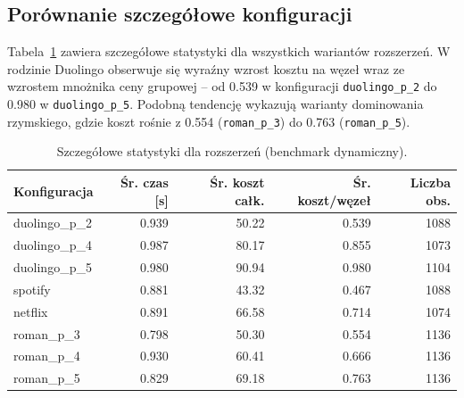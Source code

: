 \subsection{Porównanie szczegółowe konfiguracji}

Tabela~\ref{tab:ext-dynamic-detailed} zawiera szczegółowe statystyki dla wszystkich wariantów rozszerzeń. W rodzinie Duolingo obserwuje się wyraźny wzrost kosztu na węzeł wraz ze wzrostem mnożnika ceny grupowej -- od 0.539 w konfiguracji \texttt{duolingo\_p\_2} do 0.980 w \texttt{duolingo\_p\_5}. Podobną tendencję wykazują warianty dominowania rzymskiego, gdzie koszt rośnie z 0.554 (\texttt{roman\_p\_3}) do 0.763 (\texttt{roman\_p\_5}).

\begin{table}[H]
    \centering
    \caption{Szczegółowe statystyki dla rozszerzeń (benchmark dynamiczny).}
    \label{tab:ext-dynamic-detailed}
    \begin{tabular}{lrrrr}
        \toprule
        \textbf{Konfiguracja} & \textbf{Śr. czas [s]} & \textbf{Śr. koszt całk.} & \textbf{Śr. koszt/węzeł} & \textbf{Liczba obs.} \\
        \midrule
        duolingo\_p\_2        & 0.939                 & 50.22                    & 0.539                    & 1088                 \\
        duolingo\_p\_4        & 0.987                 & 80.17                    & 0.855                    & 1073                 \\
        duolingo\_p\_5        & 0.980                 & 90.94                    & 0.980                    & 1104                 \\
        spotify               & 0.881                 & 43.32                    & 0.467                    & 1088                 \\
        netflix               & 0.891                 & 66.58                    & 0.714                    & 1074                 \\
        roman\_p\_3           & 0.798                 & 50.30                    & 0.554                    & 1136                 \\
        roman\_p\_4           & 0.930                 & 60.41                    & 0.666                    & 1136                 \\
        roman\_p\_5           & 0.829                 & 69.18                    & 0.763                    & 1136                 \\
        \bottomrule
    \end{tabular}
\end{table}

